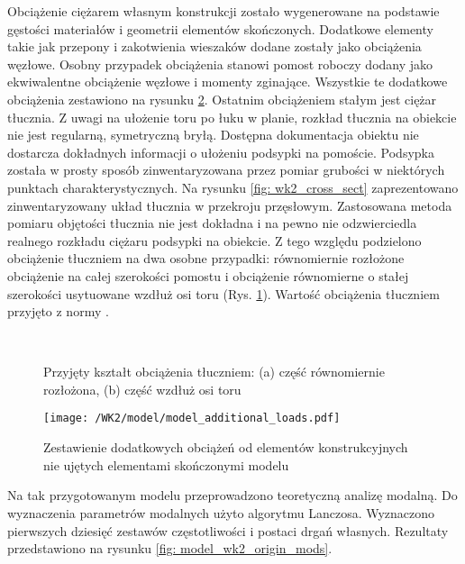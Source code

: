 Obciążenie ciężarem własnym konstrukcji zostało wygenerowane na podstawie gęstości materiałów i geometrii elementów skończonych. Dodatkowe elementy takie jak przepony i zakotwienia wieszaków dodane zostały jako obciążenia węzłowe. Osobny przypadek obciążenia stanowi pomost roboczy dodany jako ekwiwalentne obciążenie węzłowe i momenty zginające. Wszystkie te dodatkowe obciążenia zestawiono na rysunku \ref{fig: model_wk2_add_loads}. Ostatnim obciążeniem stałym jest ciężar tłucznia. Z uwagi na ułożenie toru po łuku w planie, rozkład tłucznia na obiekcie nie jest regularną, symetryczną bryłą. Dostępna dokumentacja obiektu nie dostarcza dokładnych informacji o ułożeniu podsypki na pomoście. Podsypka została w prosty sposób zinwentaryzowana przez pomiar grubości w niektórych punktach charakterystycznych. Na rysunku \ref{fig: wk2_cross_sect} zaprezentowano zinwentaryzowany układ tłucznia w przekroju przęsłowym. Zastosowana metoda pomiaru objętości tłucznia nie jest dokładna i na pewno nie odzwierciedla realnego rozkładu ciężaru podsypki na obiekcie. Z tego względu podzielono obciążenie tłuczniem na dwa osobne przypadki: równomiernie rozłożone obciążenie na całej szerokości pomostu i obciążenie równomierne o stałej szerokości usytuowane wzdłuż osi toru (Rys. \ref{fig: model_wk2_balast_loadcase}). Wartość obciążenia tłuczniem przyjęto z normy \parencite{PKNg}. 

\begin{figure}[hbt!]
	\centering
	 \\
	\captionsetup{justification=centering}
	\caption{Przyjęty kształt obciążenia tłuczniem: (a) część równomiernie rozłożona, (b) część wzdłuż osi toru}
	\label{fig: model_wk2_balast_loadcase}
\end{figure}

\begin{figure}[hbt!]
	\centering
	\texttt{[image: /WK2/model/model\_additional\_loads.pdf]}
	\captionsetup{justification=centering}
	\caption{Zestawienie dodatkowych obciążeń od elementów konstrukcyjnych nie ujętych elementami skończonymi modelu}
	\label{fig: model_wk2_add_loads}
\end{figure}

Na tak przygotowanym modelu przeprowadzono teoretyczną analizę modalną. Do wyznaczenia parametrów modalnych użyto algorytmu Lanczosa. Wyznaczono pierwszych dziesięć zestawów częstotliwości i postaci drgań własnych. Rezultaty przedstawiono na rysunku \ref{fig: model_wk2_origin_mods}.


